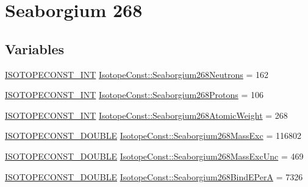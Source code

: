 \hypertarget{group___isotope_const-_seaborgium-_sg268}{}\section{Seaborgium 268}
\label{group___isotope_const-_seaborgium-_sg268}
\subsection*{Variables}
\begin{DoxyCompactItemize}
\item 
\mbox{\hyperlink{group___isotope_const-_macros_ga5f18360b3e99483a35c32d789e62621c}{I\+S\+O\+T\+O\+P\+E\+C\+O\+N\+S\+T\+\_\+\+I\+NT}} \mbox{\hyperlink{group___isotope_const-_seaborgium-_sg268_gacb492fdfa624811cdf1c36d90ad318ab}{Isotope\+Const\+::\+Seaborgium268\+Neutrons}} = 162
\item 
\mbox{\hyperlink{group___isotope_const-_macros_ga5f18360b3e99483a35c32d789e62621c}{I\+S\+O\+T\+O\+P\+E\+C\+O\+N\+S\+T\+\_\+\+I\+NT}} \mbox{\hyperlink{group___isotope_const-_seaborgium-_sg268_gae9058dc4a6b4c1bcb13e1372130c0c8f}{Isotope\+Const\+::\+Seaborgium268\+Protons}} = 106
\item 
\mbox{\hyperlink{group___isotope_const-_macros_ga5f18360b3e99483a35c32d789e62621c}{I\+S\+O\+T\+O\+P\+E\+C\+O\+N\+S\+T\+\_\+\+I\+NT}} \mbox{\hyperlink{group___isotope_const-_seaborgium-_sg268_ga5b0f95d2a2bd15127203a3b4421ba749}{Isotope\+Const\+::\+Seaborgium268\+Atomic\+Weight}} = 268
\item 
\mbox{\hyperlink{group___isotope_const-_macros_ga8f45a7272ce02c0b4c65c44636ed719a}{I\+S\+O\+T\+O\+P\+E\+C\+O\+N\+S\+T\+\_\+\+D\+O\+U\+B\+LE}} \mbox{\hyperlink{group___isotope_const-_seaborgium-_sg268_ga25024a4c25304ff6d0e2f1834c1b4da2}{Isotope\+Const\+::\+Seaborgium268\+Mass\+Exc}} = 116802
\item 
\mbox{\hyperlink{group___isotope_const-_macros_ga8f45a7272ce02c0b4c65c44636ed719a}{I\+S\+O\+T\+O\+P\+E\+C\+O\+N\+S\+T\+\_\+\+D\+O\+U\+B\+LE}} \mbox{\hyperlink{group___isotope_const-_seaborgium-_sg268_ga50fb149a5a317f79637cddeb62589cb5}{Isotope\+Const\+::\+Seaborgium268\+Mass\+Exc\+Unc}} = 469
\item 
\mbox{\hyperlink{group___isotope_const-_macros_ga8f45a7272ce02c0b4c65c44636ed719a}{I\+S\+O\+T\+O\+P\+E\+C\+O\+N\+S\+T\+\_\+\+D\+O\+U\+B\+LE}} \mbox{\hyperlink{group___isotope_const-_seaborgium-_sg268_ga81e835ea89d76f9eb35da0e117c2e70e}{Isotope\+Const\+::\+Seaborgium268\+Bind\+E\+PerA}} = 7326
\item 

\end{DoxyCompactItemize}
